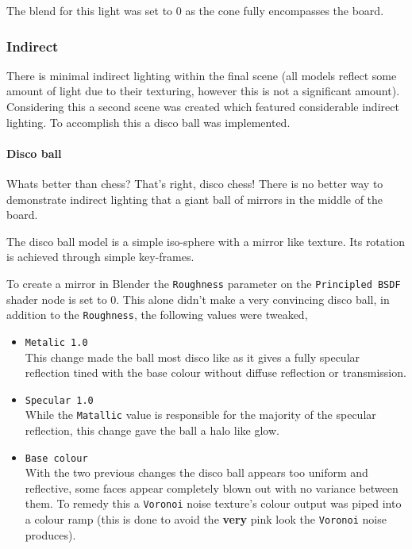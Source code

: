 \documentclass[11pt]{article}
\begin{document}
The blend for this light was set to 0 as the cone fully encompasses the board.
\subsubsection{Indirect}
\label{sec:org05fff56}
There is minimal indirect lighting within the final scene (all models
reflect some amount of light due to their texturing, however this is not a
significant amount). Considering this a second scene was created which featured
considerable indirect lighting. To accomplish this a disco ball was implemented.
\paragraph{Disco ball}
\label{sec:orga93bd61}
Whats better than chess? That's right, disco chess! There is no better way to
demonstrate indirect lighting that a giant ball of mirrors in the middle of the board.

The disco ball model is a simple iso-sphere with a mirror like texture. Its
rotation is achieved through simple key-frames.

To create a mirror in Blender the \texttt{Roughness} parameter on the \texttt{Principled BSDF}
shader node is set to 0. This alone didn't make a very convincing disco ball, in
addition to the \texttt{Roughness}, the following values were tweaked,
\begin{itemize}
\item \texttt{Metalic 1.0}\\
This change made the ball most disco like as it gives a fully specular
reflection tined with the base colour without diffuse reflection or
transmission.
\item \texttt{Specular 1.0}\\
While the \texttt{Matallic} value is responsible for the majority of the specular
reflection, this change gave the ball a halo like glow.
\item \texttt{Base colour}\\
With the two previous changes the disco ball appears too uniform and reflective, some
faces appear completely blown out with no variance between them. To remedy
this a \texttt{Voronoi} noise texture's colour output was piped into a colour ramp
(this is done to avoid the \textbf{very} pink look  the \texttt{Voronoi} noise produces).
\end{itemize}
\end{document}
